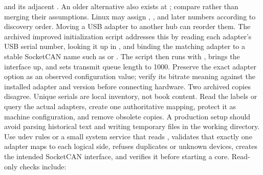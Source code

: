 {}
\markdownRendererSectionEnd 
\markdownRendererSectionEnd \markdownRendererSectionBegin
{}\markdownRendererInterblockSeparator
{}\markdownRendererBlockQuoteBegin
{}  and its adjacent . An older alternative also exists at ; compare rather than merging their assumptions.\markdownRendererBlockQuoteEnd \markdownRendererInterblockSeparator
{}Linux may assign , , and later numbers according to discovery order. Moving a USB adapter to another hub can reorder them. The archived improved initialization script addresses this by reading each adapter's USB serial number, looking it up in , and binding the matching adapter to a stable SocketCAN name such as  or .\markdownRendererParagraphSeparator
{}The script then runs  with , brings the interface up, and sets transmit queue length to 1000. Preserve the exact adapter option as an observed configuration value; verify its bitrate meaning against the installed adapter and  version before connecting hardware.\markdownRendererParagraphSeparator
{}Two archived  copies disagree. Unique serials are local inventory, not book content. Read the labels or query the actual adapters, create one authoritative mapping, protect it as machine configuration, and remove obsolete copies.\markdownRendererInterblockSeparator
{}\markdownRendererSectionBegin
{}\markdownRendererInterblockSeparator
{}A production setup should avoid parsing historical  text and writing temporary files in the working directory. Use udev rules or a small system service that reads , validates that exactly one adapter maps to each logical side, refuses duplicates or unknown devices, creates the intended SocketCAN interface, and verifies it before starting a core.\markdownRendererParagraphSeparator
{}Read-only checks include:\markdownRendererInterblockSeparator
{}\markdownRendererInterblockSeparator
